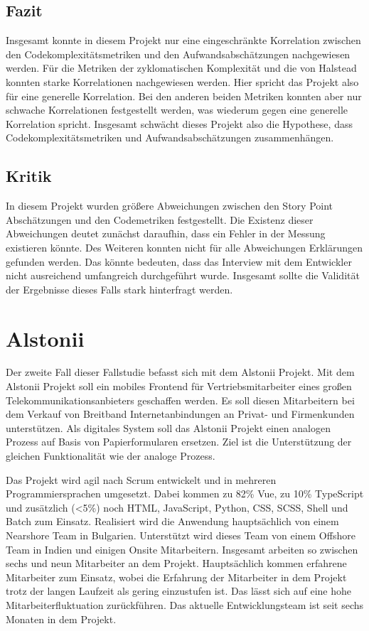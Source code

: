 \subsection{Fazit}\label{ingrid-fazit}

Insgesamt konnte in diesem Projekt nur eine eingeschränkte Korrelation
zwischen den Codekomplexitätsmetriken und den Aufwandsabschätzungen
nachgewiesen werden. Für die Metriken der zyklomatischen Komplexität und
die von Halstead konnten starke Korrelationen nachgewiesen werden. Hier
spricht das Projekt also für eine generelle Korrelation. Bei den anderen
beiden Metriken konnten aber nur schwache Korrelationen festgestellt
werden, was wiederum gegen eine generelle Korrelation spricht. Insgesamt
schwächt dieses Projekt also die Hypothese, dass
Codekomplexitätsmetriken und Aufwandsabschätzungen zusammenhängen.

\subsection{Kritik}\label{ingrid-kritik}

In diesem Projekt wurden größere Abweichungen zwischen den Story Point
Abschätzungen und den Codemetriken festgestellt. Die Existenz dieser
Abweichungen deutet zunächst daraufhin, dass ein Fehler in der Messung
existieren könnte. Des Weiteren konnten nicht für alle Abweichungen
Erklärungen gefunden werden. Das könnte bedeuten, dass das Interview mit
dem Entwickler nicht ausreichend umfangreich durchgeführt wurde.
Insgesamt sollte die Validität der Ergebnisse dieses Falls stark
hinterfragt werden.

\section{Alstonii}\label{alstonii}

Der zweite Fall dieser Fallstudie befasst sich mit dem Alstonii
Projekt. Mit dem Alstonii Projekt soll ein mobiles Frontend für
Vertriebsmitarbeiter eines großen Telekommunikationsanbieters geschaffen
werden. Es soll diesen Mitarbeitern bei dem Verkauf von Breitband
Internetanbindungen an Privat- und Firmenkunden unterstützen. Als
digitales System soll das Alstonii Projekt einen analogen Prozess auf Basis
von Papierformularen ersetzen. Ziel ist die Unterstützung der gleichen
Funktionalität wie der analoge Prozess.

Das Projekt wird agil nach Scrum entwickelt und in mehreren
Programmiersprachen umgesetzt. Dabei kommen zu 82\% Vue, zu 10\%
TypeScript und zusätzlich (\textless5\%) noch HTML, JavaScript, Python,
CSS, SCSS, Shell und Batch zum Einsatz. Realisiert
wird die Anwendung hauptsächlich von einem Nearshore Team in Bulgarien.
Unterstützt wird dieses Team von einem Offshore Team in Indien und
einigen Onsite Mitarbeitern. Insgesamt arbeiten so zwischen sechs und
neun Mitarbeiter an dem Projekt. Hauptsächlich kommen erfahrene
Mitarbeiter zum Einsatz, wobei die Erfahrung der Mitarbeiter in dem
Projekt trotz der langen Laufzeit als gering einzustufen ist. Das lässt
sich auf eine hohe Mitarbeiterfluktuation zurückführen. Das aktuelle
Entwicklungsteam ist seit sechs Monaten in dem Projekt.

